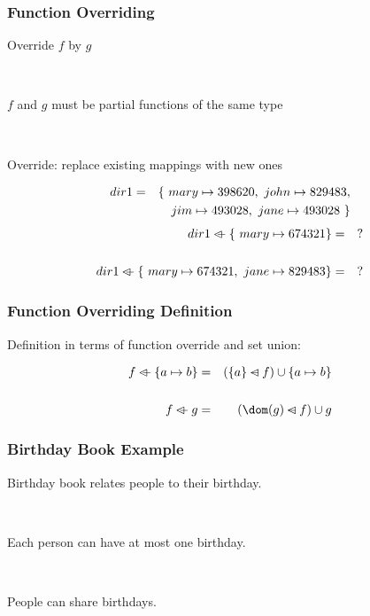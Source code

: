 \documentclass{beamer}
\begin{document}
\begin{frame}


\frametitle{Function Overriding}

 \alert{Override} $f$ by $g$ ~~

~

 $f$ and $g$ must be partial functions of the \alert{same type}

~

Override: \alert{replace}  existing mappings with new ones


%
\begin{eqnarray*}
    dir1 & = &
    \{~  mary \mapsto 398620, ~  john \mapsto 829483, \\
&& ~~~ jim \mapsto 493028, ~  jane \mapsto 493028 ~\}
\end{eqnarray*}
\begin{eqnarray*}
dir1  \mathbin{\lhd\mkern-9mu-}   \{~  mary \mapsto 674321 \}  &=& ? \\ &\\
dir1  \mathbin{\lhd\mkern-9mu-}   \{~  mary \mapsto 674321,~  jane \mapsto 829483 \}  &=& ? \\\end{eqnarray*}

\end{frame}



\begin{frame}

\frametitle{Function Overriding Definition}

Definition in terms of function \alert{override} and \alert{set union}:

\pause
\begin{eqnarray*}
     f \ovl \set{a \mapsto b} &=&
     (\set{a}\domsub f) \cup \set{a \mapsto b} \\ &\\
     f \ovl g &=&
     (\dom(g)\domsub f) \cup g
\end{eqnarray*}
\end{frame}



\begin{frame}


\frametitle{Birthday Book Example}

Birthday book relates people to their birthday.

~

Each person can have at most one birthday.

~

People can share birthdays.

~


~

%

~


\end{frame}
\end{document}
